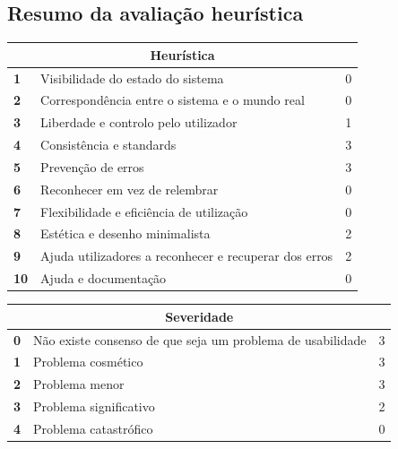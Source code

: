 \documentclass[a4paper,12pt]{article}
\begin{document}
\subsection*{Resumo da avaliação heurística}
\begin{table}[h!]
    \centering
    \begin{tabular}{|m{0.5cm}|m{12cm}|m{0.5cm}|}
        \hline
        \multicolumn{3}{|c|}{\textbf{Heurística}}                               \\ \hline
        \textbf{1}  & Visibilidade do estado do sistema                     & 0 \\ \hline
        \textbf{2}  & Correspondência entre o sistema e o mundo real        & 0 \\ \hline
        \textbf{3}  & Liberdade e controlo pelo utilizador                  & 1 \\ \hline
        \textbf{4}  & Consistência e standards                              & 3 \\ \hline
        \textbf{5}  & Prevenção de erros                                    & 3 \\ \hline
        \textbf{6}  & Reconhecer em vez de relembrar                        & 0 \\ \hline
        \textbf{7}  & Flexibilidade e eficiência de utilização              & 0 \\ \hline
        \textbf{8}  & Estética e desenho minimalista                        & 2 \\ \hline
        \textbf{9}  & Ajuda utilizadores a reconhecer e recuperar dos erros & 2 \\ \hline
        \textbf{10} & Ajuda e documentação                                  & 0 \\ \hline
    \end{tabular}
\end{table}

\begin{table}[h!]
    \centering
    \begin{tabular}{|m{0.5cm}|m{12cm}|m{0.5cm}|}
        \hline
        \multicolumn{3}{|c|}{\textbf{Severidade}}                                   \\ \hline
        \textbf{0} & Não existe consenso de que seja um problema de usabilidade & 3 \\ \hline
        \textbf{1} & Problema cosmético                                         & 3 \\ \hline
        \textbf{2} & Problema menor                                             & 3 \\ \hline
        \textbf{3} & Problema significativo                                     & 2 \\ \hline
        \textbf{4} & Problema catastrófico                                      & 0 \\ \hline
    \end{tabular}
\end{table}
\end{document}
